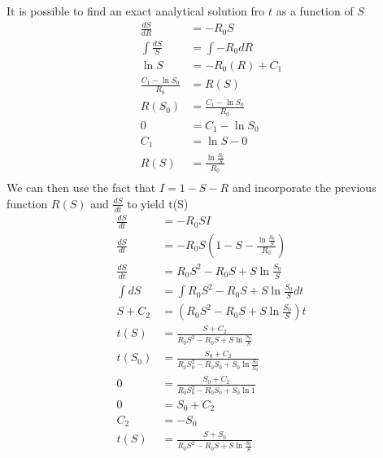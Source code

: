It is possible to find an exact analytical solution fro $t$ as a function of $S$
\begin{align*}
\frac{dS}{dR}&=-R_0S\\
\int \frac{dS}{S}&=\int -R_0dR\\
\ln{S}&=-R_0(R)+C_1\\
\frac{C_1-\ln{S_0}}{R_0}&=R(S)\\
R(S_0)&=\frac{C_1-\ln{S_0}}{R_0}\\
0&=C_1-\ln{S_0}\\
C_1&=\ln{S-0}\\
R(S)&=\frac{\ln{\frac{S_0}{S}}}{R_0}\\
\end{align*}
We can then use the fact that $I=1-S-R$ and incorporate the previous function $R(S)$ and $\frac{dS}{dt}$ to yield t(S)\\
\begin{align*}
\frac{dS}{dt}&= -R_0SI\\
\frac{dS}{dt}&=-R_0S(1-S-\frac{\ln{\frac{S_0}{S}}}{R_0})\\
\frac{dS}{dt}&=R_0S^2-R_0S+S\ln{\frac{S_0}{S}}\\
\int{dS}&=\int{R_0S^2-R_0S+S\ln{\frac{S_0}{S}}}dt\\
S+C_2&=(R_0S^2-R_0S+S\ln{\frac{S_0}{S}})t\\
t(S)&=\frac{S+C_2}{R_0S^2-R_0S+S\ln{\frac{S_0}{S}}}\\
t(S_0)&=\frac{S_0+C_2}{R_0S_0^2-R_0S_0+S_0\ln{\frac{S_0}{S_0}}}\\
0&=\frac{S_0+C_2}{R_0S_0^2-R_0S_0+S_0\ln{1}}\\
0&={S_0+C_2}\\
C_2&=-S_0\\
t(S)&=\frac{S+S_0}{R_0S^2-R_0S+S\ln{\frac{S_0}{S}}}\\
\end{align*}
